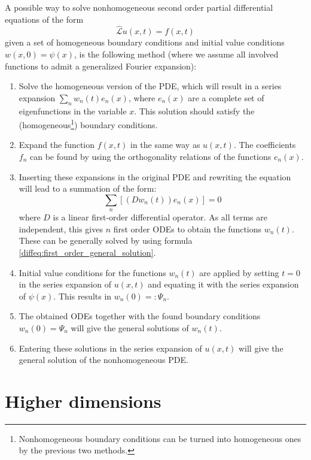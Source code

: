     \begin{method}
        A possible way to solve nonhomogeneous second order partial differential equations of the form \[\hat{\mathcal{L}}u(x,t) = f(x,t)\] given a set of homogeneous boundary conditions and initial value conditions $w(x,0) = \psi(x)$, is the following method (where we assume all involved functions to admit a generalized Fourier expansion):
        \begin{enumerate}
            \item Solve the homogeneous version of the PDE, which will result in a series expansion $\sum_nw_n(t)e_n(x)$, where $e_n(x)$ are a complete set of eigenfunctions in the variable $x$. This solution should satisfy the (homogeneous\footnote{Nonhomogeneous boundary conditions can be turned into homogeneous ones by the previous two methods.}) boundary conditions.
            \item Expand the function $f(x,t)$ in the same way as $u(x,t)$. The coefficients $f_n$ can be found by using the orthogonality relations of the functions $e_n(x)$.
            \item Inserting these expansions in the original PDE and rewriting the equation will lead to a summation of the form:
            \[\sum_n\left[\left(Dw_n(t)\right)e_n(x)\right] = 0\] where $D$ is a linear first-order differential operator. As all terms are independent, this gives $n$ first order ODEs to obtain the functions $w_n(t)$. These can be generally solved by using formula \ref{diffeq:first_order_general_solution}.
            \item Initial value conditions for the functions $w_n(t)$ are applied by setting $t=0$ in the series expansion of $u(x,t)$ and equating it with the series expansion of $\psi(x)$. This results in $w_n(0) =: \Psi_n$.
            \item The obtained ODEs together with the found boundary conditions $w_n(0) = \Psi_n$ will give the general solutions of $w_n(t)$.
            \item Entering these solutions in the series expansion of $u(x,t)$ will give the general solution of the nonhomogeneous PDE.
        \end{enumerate}
    \end{method}

\section{Higher dimensions}\label{pde:section:higher_dimensions}
